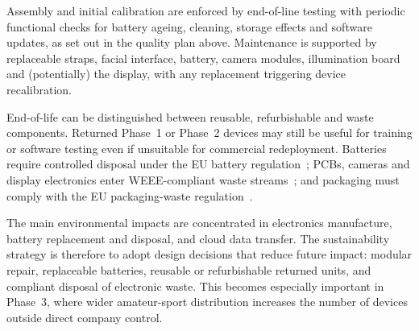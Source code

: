 Assembly and initial calibration are enforced by end-of-line testing with periodic functional checks for battery ageing, cleaning, storage effects and software updates, as set out in the quality plan above. Maintenance is supported by replaceable straps, facial interface, battery, camera modules, illumination board and (potentially) the display, with any replacement triggering device recalibration.

End-of-life can be distinguished between reusable, refurbishable and waste components. Returned Phase~1 or Phase~2 devices may still be useful for training or software testing even if unsuitable for commercial redeployment. Batteries require controlled disposal under the EU battery regulation~\cite{eu_batteries}; PCBs, cameras and display electronics enter WEEE-compliant waste streams~\cite{eu_weee}; and packaging must comply with the EU packaging-waste regulation~\cite{eu_packaging}.

The main environmental impacts are concentrated in electronics manufacture, battery replacement and disposal, and cloud data transfer. The sustainability strategy is therefore to adopt design decisions that reduce future impact: modular repair, replaceable batteries, reusable or refurbishable returned units, and compliant disposal of electronic waste. This becomes especially important in Phase~3, where wider amateur-sport distribution increases the number of devices outside direct company control.
